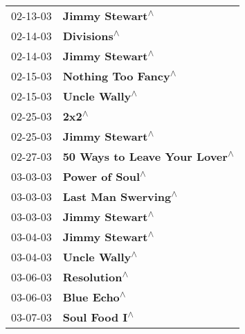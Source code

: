 \begin{supertabular}{p{0.25\columnwidth}p{0.75\columnwidth}}
 02-13-03 &                                                            \textbf{Jimmy Stewart\textsuperscript{$\wedge$}} \\
 02-14-03 &                                                                \textbf{Divisions\textsuperscript{$\wedge$}} \\
 02-14-03 &                                                            \textbf{Jimmy Stewart\textsuperscript{$\wedge$}} \\
 02-15-03 &                                                        \textbf{Nothing Too Fancy\textsuperscript{$\wedge$}} \\
 02-15-03 &                                                              \textbf{Uncle Wally\textsuperscript{$\wedge$}} \\
 02-25-03 &                                                                      \textbf{2x2\textsuperscript{$\wedge$}} \\
 02-25-03 &                                                            \textbf{Jimmy Stewart\textsuperscript{$\wedge$}} \\
 02-27-03 &                                              \textbf{50 Ways to Leave Your Lover\textsuperscript{$\wedge$}} \\
 03-03-03 &                                                            \textbf{Power of Soul\textsuperscript{$\wedge$}} \\
 03-03-03 &                                                        \textbf{Last Man Swerving\textsuperscript{$\wedge$}} \\
 03-03-03 &                                                            \textbf{Jimmy Stewart\textsuperscript{$\wedge$}} \\
 03-04-03 &                                                            \textbf{Jimmy Stewart\textsuperscript{$\wedge$}} \\
 03-04-03 &                                                              \textbf{Uncle Wally\textsuperscript{$\wedge$}} \\
 03-06-03 &                                                               \textbf{Resolution\textsuperscript{$\wedge$}} \\
 03-06-03 &                                                                \textbf{Blue Echo\textsuperscript{$\wedge$}} \\
 03-07-03 &                                                              \textbf{Soul Food I\textsuperscript{$\wedge$}} \\

\end{supertabular}
